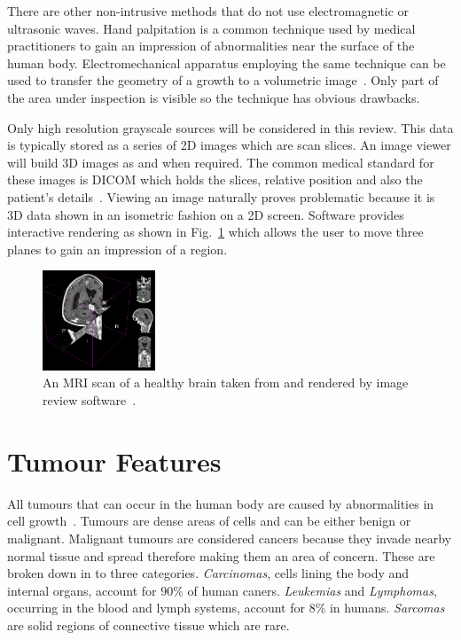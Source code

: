 \documentclass[journal]{IEEEtran}
\begin{document}
There are other non-intrusive methods that do not use electromagnetic or ultrasonic waves.
Hand palpitation is a common technique used by medical practitioners to gain an impression of abnormalities near the surface of the human body. 
Electromechanical apparatus employing the same technique can be used to transfer the geometry of a growth to a volumetric image~\cite{liu09haptic,wellman1997modeling}.  
Only part of the area under inspection is visible so the technique has obvious drawbacks.

Only high resolution grayscale sources will be considered in this review.
This data is typically stored as a series of 2D images which are scan slices.
An image viewer will build 3D images as and when required.
The common medical standard for these images is DICOM which holds the slices, relative position and also the patient's details~\cite{dicom11nema}.
Viewing an image naturally proves problematic because it is 3D data shown in an isometric fashion on a 2D screen.
Software provides interactive rendering as shown in Fig.~\ref{fig:3d} which allows the user to move three planes to gain an impression of a region.

\begin{figure}[!htb]
   \centering
   \includegraphics[width = 0.3\textwidth]{Figures/3Dview.png}
   \caption{An MRI scan of a healthy brain taken from and rendered by image review software~\cite{cia,slicer}.}
   \label{fig:3d}
\end{figure}












\section{Tumour Features}
\label{sec:tumour}

All tumours that can occur in the human body are caused by abnormalities in cell growth~\cite{cooper1992cancer}.
Tumours are dense areas of cells and can be either benign or malignant.
Malignant tumours are considered cancers because they invade nearby normal tissue and spread therefore making them an area of concern.
These are broken down in to three categories.
\emph{Carcinomas}, cells lining the body and internal organs, account for $90$\% of human caners.
\emph{Leukemias} and \emph{Lymphomas}, occurring in the blood and lymph systems, account for $8$\% in humans.
\emph{Sarcomas} are solid regions of connective tissue which are rare.
\end{document}
